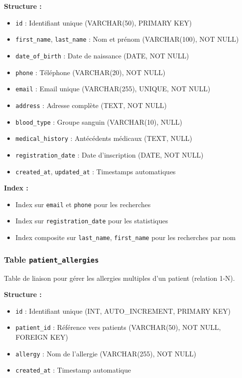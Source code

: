 \documentclass[12pt,a4paper]{report}
\begin{document}
\textbf{Structure :}
\begin{itemize}
    \item \texttt{id} : Identifiant unique (VARCHAR(50), PRIMARY KEY)
    \item \texttt{first\_name}, \texttt{last\_name} : Nom et prénom (VARCHAR(100), NOT NULL)
    \item \texttt{date\_of\_birth} : Date de naissance (DATE, NOT NULL)
    \item \texttt{phone} : Téléphone (VARCHAR(20), NOT NULL)
    \item \texttt{email} : Email unique (VARCHAR(255), UNIQUE, NOT NULL)
    \item \texttt{address} : Adresse complète (TEXT, NOT NULL)
    \item \texttt{blood\_type} : Groupe sanguin (VARCHAR(10), NULL)
    \item \texttt{medical\_history} : Antécédents médicaux (TEXT, NULL)
    \item \texttt{registration\_date} : Date d'inscription (DATE, NOT NULL)
    \item \texttt{created\_at}, \texttt{updated\_at} : Timestamps automatiques
\end{itemize}

\textbf{Index :}
\begin{itemize}
    \item Index sur \texttt{email} et \texttt{phone} pour les recherches
    \item Index sur \texttt{registration\_date} pour les statistiques
    \item Index composite sur \texttt{last\_name}, \texttt{first\_name} pour les recherches par nom
\end{itemize}

\subsubsection{Table \texttt{patient\_allergies}}

Table de liaison pour gérer les allergies multiples d'un patient (relation 1-N).

\textbf{Structure :}
\begin{itemize}
    \item \texttt{id} : Identifiant unique (INT, AUTO\_INCREMENT, PRIMARY KEY)
    \item \texttt{patient\_id} : Référence vers patients (VARCHAR(50), NOT NULL, FOREIGN KEY)
    \item \texttt{allergy} : Nom de l'allergie (VARCHAR(255), NOT NULL)
    \item \texttt{created\_at} : Timestamp automatique
\end{itemize}
\end{document}
